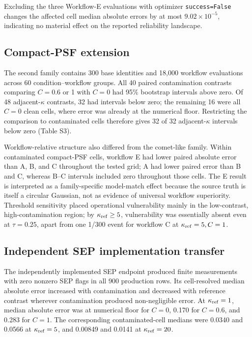 Excluding the three Workflow-E evaluations with optimizer
\texttt{success=False} changes the affected cell median absolute errors
by at most \(9.02\times10^{-5}\), indicating no material effect on the
reported reliability landscape.

\subsection{Compact-PSF extension}
\label{results-compact-psf-extension}

The second family contains 300 base identities and 18,000 workflow
evaluations across 60 condition--workflow groups. All 40 paired
contamination contrasts comparing \(C=0.6\) or 1 with \(C=0\) had
95\% bootstrap intervals above zero. Of 48 adjacent-\(\kappa\)
contrasts, 32 had intervals below zero; the remaining 16 were all
\(C=0\) clean cells, where error was already at the numerical floor.
Restricting the comparison to contaminated cells therefore gives 32 of
32 adjacent-\(\kappa\) intervals below zero (Table S3).

Workflow-relative structure also differed from the comet-like family.
Within contaminated compact-PSF cells, workflow E had lower paired
absolute error than A, B, and C throughout the tested grid; A had lower
paired error than B and C, whereas B--C intervals included zero
throughout those cells. The E result is interpreted as a
family-specific model-match effect because the source truth is itself a
circular Gaussian, not as evidence of universal workflow superiority.
Threshold sensitivity placed operational vulnerability mainly in the
low-contrast, high-contamination region; by
\(\kappa_{\rm ref}\geq5\), vulnerability was essentially absent
even at \(\tau=0.25\), apart from one 1/300 event for workflow C at
\(\kappa_{\rm ref}=5,C=1\).

\subsection{Independent SEP implementation transfer}
\label{results-sep-transfer}

The independently implemented SEP endpoint produced finite measurements
with zero nonzero SEP flags in all 900 production rows. Its
cell-resolved median absolute error increased with contamination and
decreased with reference contrast wherever contamination produced
non-negligible error. At \(\kappa_{\rm ref}=1\), median absolute
error was at numerical floor for \(C=0\), 0.170 for \(C=0.6\), and
0.283 for \(C=1\). The corresponding contaminated-cell medians were
0.0340 and 0.0566 at \(\kappa_{\rm ref}=5\), and 0.00849 and
0.0141 at \(\kappa_{\rm ref}=20\).

